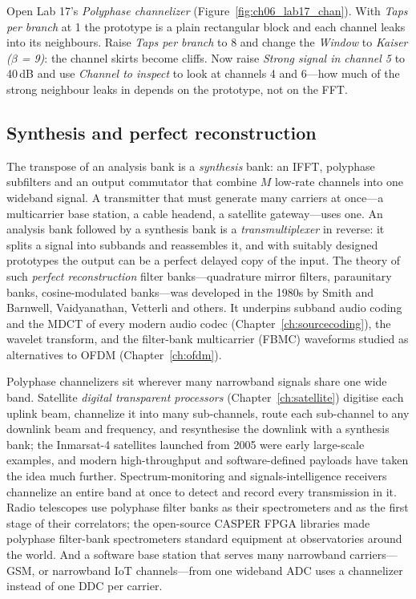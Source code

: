 \begin{tryit}
Open Lab 17's \emph{Polyphase channelizer} (Figure~\ref{fig:ch06_lab17_chan}). With \emph{Taps per branch} at 1 the prototype is a
plain rectangular block and each channel leaks into its neighbours. Raise \emph{Taps per branch}
to 8 and change the \emph{Window} to \emph{Kaiser ($\beta$ = 9)}: the channel skirts become
cliffs. Now raise \emph{Strong signal in channel 5} to 40\,dB and use \emph{Channel to inspect} to
look at channels 4 and 6---how much of the strong neighbour leaks in depends on the prototype, not
on the FFT.
\end{tryit}

\subsection{Synthesis and perfect reconstruction}

The transpose of an analysis bank is a \emph{synthesis} bank: an IFFT, polyphase subfilters and an
output commutator that combine $M$ low-rate channels into one wideband signal. A transmitter that
must generate many carriers at once---a multicarrier base station, a cable headend, a satellite
gateway---uses one. An analysis bank followed by a synthesis bank is a \emph{transmultiplexer} in
reverse: it splits a signal into subbands and reassembles it, and with suitably designed prototypes
the output can be a perfect delayed copy of the input. The theory of such \emph{perfect
reconstruction} filter banks---quadrature mirror filters, paraunitary banks, cosine-modulated
banks---was developed in the 1980s by Smith and Barnwell, Vaidyanathan, Vetterli and others. It
underpins subband audio coding and the MDCT of every modern audio codec (Chapter~\ref{ch:sourcecoding}),
the wavelet transform, and the filter-bank multicarrier (FBMC) waveforms studied as alternatives to
OFDM (Chapter~\ref{ch:ofdm}).

\begin{inpractice}
Polyphase channelizers sit wherever many narrowband signals share one wide band. Satellite
\emph{digital transparent processors} (Chapter~\ref{ch:satellite}) digitise each uplink beam,
channelize it into many sub-channels, route each sub-channel to any downlink beam and frequency, and
resynthesise the downlink with a synthesis bank; the Inmarsat-4 satellites launched from 2005 were
early large-scale examples, and modern high-throughput and software-defined payloads have taken
the idea much further. Spectrum-monitoring and signals-intelligence receivers channelize an entire
band at once to detect and record every transmission in it. Radio telescopes use polyphase filter
banks as their spectrometers and as the first stage of their correlators; the open-source CASPER
FPGA libraries made polyphase filter-bank spectrometers standard equipment at observatories around
the world. And a software base station that serves many narrowband carriers---GSM, or narrowband IoT
channels---from one wideband ADC uses a channelizer instead of one DDC per carrier.
\end{inpractice}

